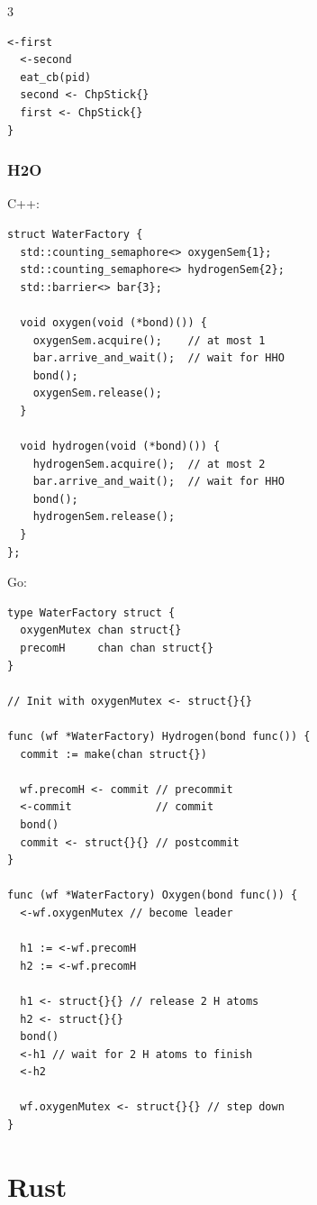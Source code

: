\documentclass[12pt, a4paper]{article}
\begin{document}
\begin{multicols*}{3}
\begin{lstlisting}[style=go,basicstyle=\ttfamily\scriptsize]
  <-first
  <-second
  eat_cb(pid)
  second <- ChpStick{}
  first <- ChpStick{}
}
\end{lstlisting}
\vspace{-1em}
\colbreak
\subsubsection{H2O}

C++:
\begin{lstlisting}[style=cpp,basicstyle=\ttfamily\scriptsize]
struct WaterFactory {
  std::counting_semaphore<> oxygenSem{1};
  std::counting_semaphore<> hydrogenSem{2};
  std::barrier<> bar{3};

  void oxygen(void (*bond)()) {
    oxygenSem.acquire();    // at most 1 
    bar.arrive_and_wait();  // wait for HHO 
    bond();
    oxygenSem.release();
  }

  void hydrogen(void (*bond)()) {
    hydrogenSem.acquire();  // at most 2
    bar.arrive_and_wait();  // wait for HHO 
    bond();
    hydrogenSem.release();
  }
};
\end{lstlisting}

Go:
\begin{lstlisting}[style=go,basicstyle=\ttfamily\scriptsize]
type WaterFactory struct {
  oxygenMutex chan struct{}
  precomH     chan chan struct{}
}

// Init with oxygenMutex <- struct{}{}

func (wf *WaterFactory) Hydrogen(bond func()) {
  commit := make(chan struct{})

  wf.precomH <- commit // precommit
  <-commit             // commit
  bond()
  commit <- struct{}{} // postcommit
}

func (wf *WaterFactory) Oxygen(bond func()) {
  <-wf.oxygenMutex // become leader

  h1 := <-wf.precomH
  h2 := <-wf.precomH

  h1 <- struct{}{} // release 2 H atoms
  h2 <- struct{}{}
  bond()
  <-h1 // wait for 2 H atoms to finish
  <-h2

  wf.oxygenMutex <- struct{}{} // step down
}
\end{lstlisting}
\vspace{-1em}
\colbreak
\section{Rust}
\lstset{style=rust}


\end{multicols*}
\end{document}
